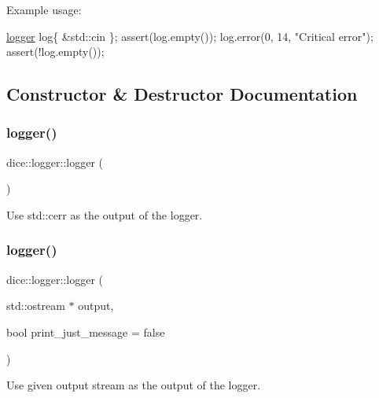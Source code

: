 Example usage\+: 
\begin{DoxyCode}
\mbox{\hyperlink{classdice_1_1logger_af96ff92a37f7376d0e96b2e3a65a0f6c}{logger}} log\{ &std::cin \};
assert(log.empty());
log.error(0, 14, \textcolor{stringliteral}{"Critical error"});
assert(!log.empty());
\end{DoxyCode}
 

\subsection{Constructor \& Destructor Documentation}
\mbox{\label{classdice_1_1logger_af96ff92a37f7376d0e96b2e3a65a0f6c}} 
\subsubsection{\texorpdfstring{logger()}{logger()}\hspace{0.1cm}{\footnotesize\ttfamily [1/2]}}
{\footnotesize\ttfamily dice\+::logger\+::logger (\begin{DoxyParamCaption}{ }\end{DoxyParamCaption})}



Use std\+::cerr as the output of the logger. 

\mbox{\label{classdice_1_1logger_a945c88b202299d0fa387ffa5fe1d7bb9}} 
\subsubsection{\texorpdfstring{logger()}{logger()}\hspace{0.1cm}{\footnotesize\ttfamily [2/2]}}
{\footnotesize\ttfamily dice\+::logger\+::logger (\begin{DoxyParamCaption}\item[{std\+::ostream $\ast$}]{output,  }\item[{bool}]{print\+\_\+just\+\_\+message = {\ttfamily false} }\end{DoxyParamCaption})\hspace{0.3cm}{\ttfamily [explicit]}}



Use given output stream as the output of the logger. 


